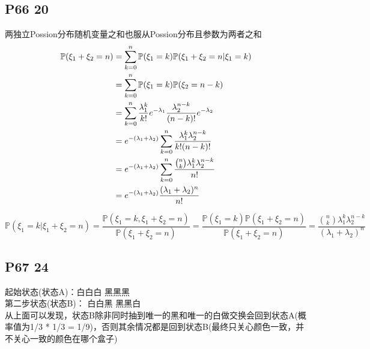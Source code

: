 \documentclass[10pt,a4paper]{article}
\begin{document}
\subsection{P66 20}
两独立Possion分布随机变量之和也服从Possion分布且参数为两者之和
\begin{align}
	\mathbb{P}(\xi_1+\xi_2=n)
	& = \sum_{k=0}^{n}\mathbb{P}(\xi_1=k)\mathbb{P}(\xi_1+\xi_2=n | \xi_1=k) \notag \\
	& = \sum_{k=0}^{n}\mathbb{P}(\xi_1=k)\mathbb{P}(\xi_2=n-k) \notag \\
	& = \sum_{k=0}^{n} \frac{\lambda_1^k}{k!}e^{-\lambda_1} \frac{\lambda_2^{n-k}}{(n-k)!}e^{-\lambda_2} \notag \\
	& = e^{-(\lambda_1+\lambda_2)}\sum_{k=0}^{n} \frac{\lambda_1^k \lambda_2^{n-k}}{k!(n-k)!} \notag \\
	& = e^{-(\lambda_1+\lambda_2)}\sum_{k=0}^{n} \frac{{n \choose k} \lambda_1^k \lambda_2^{n-k}}{n!} \notag \\
	& = e^{-(\lambda_1+\lambda_2)} \frac{(\lambda_1+\lambda_2)^n}{n!} \notag 
\end{align}

$$ \mathbb{P}(\xi_1=k | \xi_1+\xi_2=n)=\frac{\mathbb{P}(\xi_1=k , \xi_1+\xi_2=n)}{\mathbb{P}(\xi_1+\xi_2=n)}=\frac{\mathbb{P}(\xi_1=k)\mathbb{P}(\xi_1+\xi_2=n)}{\mathbb{P}(\xi_1+\xi_2=n)}=\frac{{n \choose k} \lambda_1^k \lambda_2^{n-k}}{(\lambda_1 + \lambda_2)^n} $$



\subsection{P67 24}
起始状态(状态A)：白白白  黑黑黑 \\
第二步状态(状态B)： 白白黑 黑黑白 \\

从上面可以发现，状态B除非同时抽到唯一的黑和唯一的白做交换会回到状态A(概率值为1/3 * 1/3 = 1/9)，否则其余情况都是回到状态B(最终只关心颜色一致，并不关心一致的颜色在哪个盒子)
\end{document}
